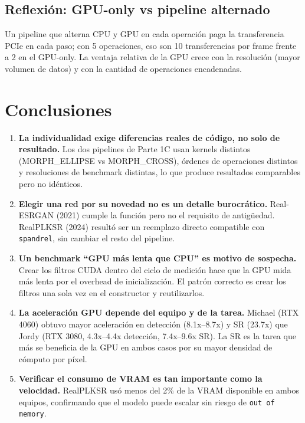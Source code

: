 \documentclass[12pt,a4paper]{article}
\let\oldsubsection\subsection
\renewcommand{\subsection}[1]{\needspace{5\baselineskip}\oldsubsection{#1}}
\begin{document}
\subsection{Reflexión: GPU-only vs pipeline alternado}

Un pipeline que alterna CPU y GPU en cada operación paga la transferencia PCIe en cada paso; con 5 operaciones, eso son 10 transferencias por frame frente a 2 en el GPU-only. La ventaja relativa de la GPU crece con la resolución (mayor volumen de datos) y con la cantidad de operaciones encadenadas.

\section{Conclusiones}

\begin{enumerate}

\item \textbf{La individualidad exige diferencias reales de código, no solo de resultado.} Los dos pipelines de Parte 1C usan kernels distintos (MORPH\_ELLIPSE vs MORPH\_CROSS), órdenes de operaciones distintos y resoluciones de benchmark distintas, lo que produce resultados comparables pero no idénticos.

\item \textbf{Elegir una red por su novedad no es un detalle burocrático.} Real-ESRGAN (2021) cumple la función pero no el requisito de antigüedad. RealPLKSR (2024) resultó ser un reemplazo directo compatible con \texttt{spandrel}, sin cambiar el resto del pipeline.

\item \textbf{Un benchmark ``GPU más lenta que CPU'' es motivo de sospecha.} Crear los filtros CUDA dentro del ciclo de medición hace que la GPU mida más lenta por el overhead de inicialización. El patrón correcto es crear los filtros una sola vez en el constructor y reutilizarlos.

\item \textbf{La aceleración GPU depende del equipo y de la tarea.} Michael (RTX 4060) obtuvo mayor aceleración en detección (8.1x--8.7x) y SR (23.7x) que Jordy (RTX 3080, 4.3x--4.4x detección, 7.4x--9.6x SR). La SR es la tarea que más se beneficia de la GPU en ambos casos por su mayor densidad de cómputo por píxel.

\item \textbf{Verificar el consumo de VRAM es tan importante como la velocidad.} RealPLKSR usó menos del 2\% de la VRAM disponible en ambos equipos, confirmando que el modelo puede escalar sin riesgo de \texttt{out of memory}.

\end{enumerate}
\end{document}
